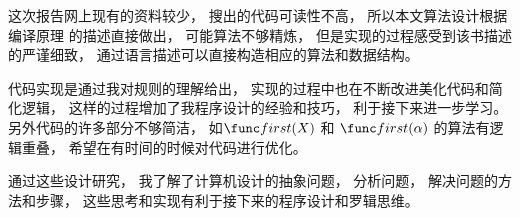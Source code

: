 \documentclass[../report]{subfiles}
\begin{document}
这次报告网上现有的资料较少，
搜出的代码可读性不高，
所以本文算法设计根据编译原理
的描述直接做出，
可能算法不够精炼，
但是实现的过程感受到该书描述的严谨细致，
通过语言描述可以直接构造相应的算法和数据结构。

代码实现是通过我对规则的理解给出，
实现的过程中也在不断改进美化代码和简化逻辑，
这样的过程增加了我程序设计的经验和技巧，
利于接下来进一步学习。
另外代码的许多部分不够简洁，
如$\first(X)$ 和 $\first(\alpha)$ 的算法有逻辑重叠，
希望在有时间的时候对代码进行优化。


通过这些设计研究，
我了解了计算机设计的抽象问题，
分析问题，
解决问题的方法和步骤，
这些思考和实现有利于接下来的程序设计和罗辑思维。
\end{document}
